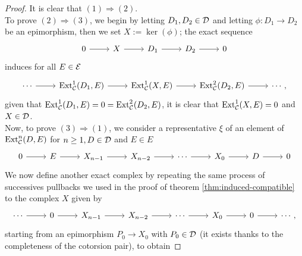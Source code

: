 \begin{proof}
        It is clear that $(1) \Rightarrow (2)$.\\
         To prove $(2) \Rightarrow (3)$, we begin by letting $D_1, D_2 \in \mathcal{D}$ and letting $\phi\colon D_1 \longrightarrow D_2 $ be an epimorphism, then we set $X:=\ker(\phi)$; the exact sequence 
        \[\begin{tikzcd}
            0 & X & {D_1} & {D_2} & 0
            \arrow[from=1-1, to=1-2]
            \arrow[from=1-2, to=1-3]
            \arrow[from=1-3, to=1-4]
            \arrow[from=1-4, to=1-5]
        \end{tikzcd}\]
        induces for all $E \in \mathcal{E}$
        \[\begin{tikzcd}
            \cdots & {\Ext^1_\C(D_1, E)} & {\Ext^1_\C(X, E)} & {\Ext^2_\C(D_2,E)} & {\cdots,}
            \arrow[from=1-1, to=1-2]
            \arrow[from=1-2, to=1-3]
            \arrow[from=1-3, to=1-4]
            \arrow[from=1-4, to=1-5]
        \end{tikzcd}\]
        given that ${\mathrm{Ext}^1_{\mathcal{C}}(D_1, E)} = 0 = {\mathrm{Ext}^2_{\mathcal{C}}(D_2,E)}$, it is clear that ${\mathrm{Ext}^1_{\mathcal{C}}(X, E)} = 0$ and $X \in \mathcal{D}$.\\
        Now, to prove $(3) \Rightarrow (1)$, we consider a representative $\xi$ of an element of $\mathrm{Ext}^n_{\mathcal{C}}(D,E)$ for $n \geq 1, D \in \mathcal{D}$ and $E \in E$ 
        \[\begin{tikzcd}
            0 & E & {X_{n-1}} & {X_{n-2}} & \cdots & {X_0} & D & 0
            \arrow[from=1-1, to=1-2]
            \arrow[from=1-2, to=1-3]
            \arrow[from=1-3, to=1-4]
            \arrow[from=1-4, to=1-5]
            \arrow[from=1-5, to=1-6]
            \arrow[from=1-6, to=1-7]
            \arrow[from=1-7, to=1-8]
        \end{tikzcd}\]
        We now define another exact complex by repeating the same process of successives pullbacks we used in the proof of theorem \ref{thm:induced-compatible} to the complex $X$ given by
        \[\begin{tikzcd}
            \cdots & 0 & {X_{n-1}} & {X_{n-2}} & \cdots & {X_0} & 0 & {\cdots,}
            \arrow[from=1-1, to=1-2]
            \arrow[from=1-2, to=1-3]
            \arrow[from=1-3, to=1-4]
            \arrow[from=1-4, to=1-5]
            \arrow[from=1-5, to=1-6]
            \arrow[from=1-6, to=1-7]
            \arrow[from=1-7, to=1-8]
        \end{tikzcd}\]
        starting from an epimorphism $P_0 \longrightarrow X_0$ with $P_0 \in \mathcal{D}$ (it exists thanks to the completeness of the cotorsion pair), to obtain

\end{proof}
